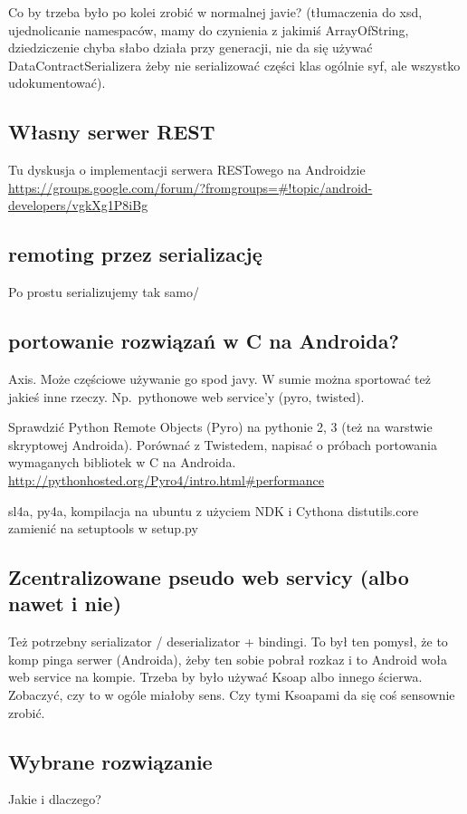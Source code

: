 \documentclass[twoside,a4paper]{book}
\begin{document}
Co by trzeba było po kolei zrobić w normalnej javie? (tłumaczenia do xsd, ujednolicanie namespaców, mamy do czynienia z jakimiś ArrayOfString, dziedziczenie chyba słabo działa przy generacji, nie da się używać DataContractSerializera żeby nie serializować części klas ogólnie syf, ale wszystko udokumentować). 

\subsection{Własny serwer REST}
Tu dyskusja o implementacji serwera RESTowego na Androidzie \url{https://groups.google.com/forum/?fromgroups=#!topic/android-developers/vgkXg1P8iBg}

\subsection{remoting przez serializację}
Po prostu serializujemy tak samo/

\subsection{portowanie rozwiązań w C na Androida?}
Axis. Może częściowe używanie go spod javy. W sumie można sportować też jakieś inne rzeczy. Np.\ pythonowe web service'y (pyro, twisted).

Sprawdzić Python Remote Objects (Pyro) na pythonie 2, 3 (też na warstwie skryptowej Androida). Porównać z Twistedem, napisać o próbach portowania wymaganych bibliotek w C na Androida. \url{http://pythonhosted.org/Pyro4/intro.html#performance}

sl4a, py4a, kompilacja na ubuntu z użyciem NDK i Cythona
distutils.core zamienić na setuptools w setup.py

\subsection{Zcentralizowane pseudo web servicy (albo nawet i nie)}
Też potrzebny serializator / deserializator + bindingi. To był ten pomysł, że to komp pinga serwer (Androida), żeby ten sobie pobrał rozkaz i to Android woła web service na kompie. Trzeba by było używać Ksoap albo innego ścierwa. Zobaczyć, czy to w ogóle miałoby sens. Czy tymi Ksoapami da się coś sensownie zrobić.

\subsection{Wybrane rozwiązanie}
Jakie i dlaczego?
\end{document}
